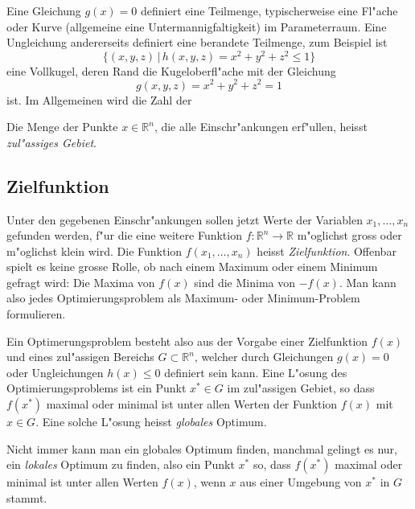 Eine Gleichung $g(x)=0$ definiert eine Teilmenge, typischerweise eine
Fl"ache oder Kurve (allgemeine eine Untermannigfaltigkeit) im 
Parameterraum.
Eine Ungleichung andererseits definiert eine berandete Teilmenge,
zum Beispiel ist
\[
\{(x,y,z)\,|\,h(x,y,z)=x^2+y^2+z^2\le 1\}
\]
eine Vollkugel, deren Rand die Kugeloberfl"ache mit der Gleichung
\[
g(x,y,z)=x^2+y^2+z^2=1
\]
ist. Im Allgemeinen wird die Zahl der 

\begin{definition}
Die Menge der Punkte $x\in\mathbb R^n$, die alle Einschr"ankungen
erf"ullen, heisst {\em zul"assiges Gebiet}.
\end{definition}

\subsection{Zielfunktion}
Unter den gegebenen Einschr"ankungen sollen jetzt Werte der
Variablen $x_1,\dots,x_n$ gefunden werden, f"ur die eine weitere
Funktion $f\colon \mathbb R^n \to \mathbb R$ m"oglichst gross
oder m"oglichst klein wird.
Die Funktion $f(x_1,\dots,x_n)$ heisst {\em Zielfunktion}.
Offenbar spielt es keine grosse Rolle, ob nach einem Maximum oder einem
Minimum gefragt wird: Die Maxima von $f(x)$ sind die Minima von $-f(x)$.
Man kann also jedes Optimierungsproblem als Maximum- oder Minimum-Problem
formulieren.

Ein Optimerungsproblem besteht also aus der Vorgabe einer Zielfunktion
$f(x)$ und eines zul"assigen Bereichs $G\subset \mathbb R^n$, welcher
durch Gleichungen $g(x)=0$ oder Ungleichungen $h(x)\le 0$ 
definiert sein kann.
Eine L"osung des Optimierungsproblems ist ein Punkt $x^*\in G$ im zul"assigen
Gebiet, so dass $f(x^*)$ maximal oder minimal ist unter allen Werten
der Funktion $f(x)$ mit $x\in G$. Eine solche L"osung heisst
{\it globales} Optimum.

Nicht immer kann man ein globales Optimum finden, manchmal gelingt es
nur, ein {\it lokales} Optimum zu finden, also ein Punkt $x^*$ so,
dass $f(x^*)$ maximal oder minimal ist unter allen Werten $f(x)$,
wenn $x$ aus einer Umgebung von $x^*$ in $G$ stammt.

